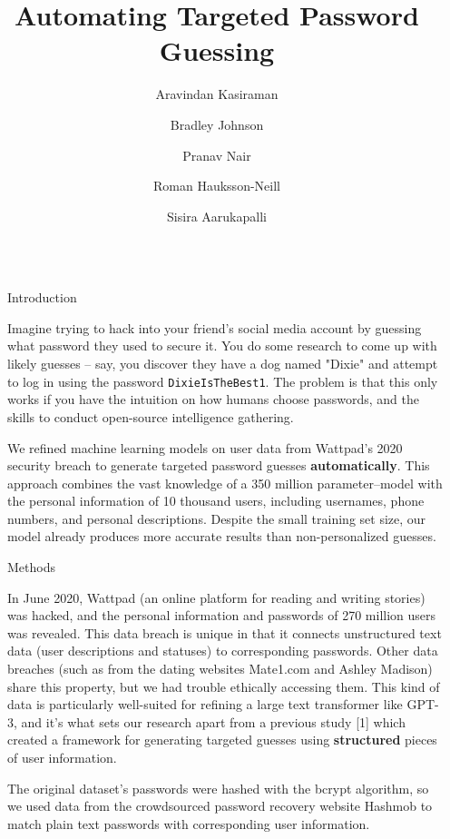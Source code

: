 \documentclass[final]{beamer}
\title{Automating Targeted Password Guessing}
\author{Aravindan Kasiraman \and Bradley Johnson \and Pranav Nair \and Roman Hauksson-Neill \and Sisira Aarukapalli }
\newlength{\sepwidth}
\newlength{\colwidth}
\newcommand{\separatorcolumn}{\begin{column}{\sepwidth}\end{column}}
\begin{document}
\begin{frame}[t]
\begin{columns}[t]
\separatorcolumn
\begin{column}{\colwidth}

  \begin{block}{Introduction}

Imagine trying to hack into your friend's social media account by guessing what password they used to secure it. You do some research to come up with likely guesses – say, you discover they have a dog named "Dixie" and attempt to log in using the password {\tt DixieIsTheBest1}. The problem is that this only works if you have the intuition on how humans choose passwords, and the skills to conduct open-source intelligence gathering.

We refined machine learning models on user data from Wattpad's 2020 security breach to generate targeted password guesses \textbf{automatically}. This approach combines the vast knowledge of a 350 million parameter–model with the personal information of 10 thousand users, including usernames, phone numbers, and personal descriptions. Despite the small training set size, our model already produces more accurate results than non-personalized guesses.

  \end{block}

  \begin{block}{Methods}

    In June 2020, Wattpad (an online platform for reading and writing stories) was hacked, and the personal information and passwords of 270 million users was revealed. This data breach is unique in that it connects unstructured text data (user descriptions and statuses) to corresponding passwords. Other data breaches (such as from the dating websites Mate1.com and Ashley Madison) share this property, but we had trouble ethically accessing them. This kind of data is particularly well-suited for refining a large text transformer like GPT-3, and it's what sets our research apart from a previous study [1] which created a framework for generating targeted guesses using \textbf{structured} pieces of user information.
    
    The original dataset's passwords were hashed with the bcrypt algorithm, so we used data from the crowdsourced password recovery website Hashmob to match plain text passwords with corresponding user information.
    
    \vspace{12mm}


\end{block}
\end{column}
\end{columns}
\end{frame}
\end{document}
